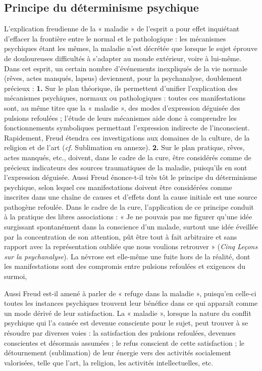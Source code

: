 \subsection{Principe du déterminisme psychique}

L'explication freudienne de la « maladie » de l'esprit a pour effet inquiétant
d'effacer la frontière entre le normal et
le pathologique : les mécanismes psychiques étant les mêmes, la maladie
n'est décrétée que lorsque le sujet
éprouve de douloureuses difficultés à
s'adapter au monde extérieur, voire à
lui-même. Dans cet esprit, un certain
nombre d'événements inexpliqués de la
vie normale (rêves, actes manqués,
lapsus) deviennent, pour la psychanalyse, doublement précieux : {\bf 1.} Sur le
plan théorique, ils permettent d’unifier
l'explication des mécanismes  psychiques, normaux ou pathologiques :
toutes ces manifestations sont, au même
titre que la « maladie », des modes d’expression déguisée des pulsions refoulées ; l'étude de leurs
mécanismes aide donc à comprendre les
fonctionnements symboliques permettant l'expression indirecte de l’inconscient. Rapidement, Freud étendra ces
investigations aux domaines de la
culture, de la religion et de l’art ({\it cf.}
Sublimation en annexe). {\bf 2.} Sur le plan pratique,
rêves, actes manqués, etc., doivent, dans
le cadre de la cure, être considérés
comme de précieux indicateurs des
sources traumatiques de la maladie,
puisqu'ils en sont l'expression déguisée.
Aussi Freud énonce-t-il très tôt le principe du déterminisme psychique, selon
lequel ces manifestations doivent être
considérées comme inscrites dans une
chaîne de causes et d'effets dont la
cause initiale est une source pathogène
refoulée. Dans le cadre de la cure, l'application de ce principe conduit à la pratique des libres associations : « Je ne
pouvais pas me figurer qu'une idée surgissant spontanément dans la
conscience d’un malade, surtout une
idée éveillée par la concentration de son
attention, pût être tout à fait arbitraire et
sans rapport avec la représentation
oubliée que nous voulions retrouver »
({\it Cinq Leçons sur la psychanalyse}). La
névrose est elle-même une fuite hors de
la réalité, dont les manifestations sont
des compromis entre pulsions refoulées
et exigences du surmoi,

Aussi Freud est-il amené à parler de
« refuge dans la maladie », puisqu'en
celle-ci toutes les instances psychiques
trouvent leur bénéfice dans ce qui apparaît comme un mode dérivé de leur
satisfaction. La « maladie », lorsque la
nature du conflit psychique qui l’a causée est devenue consciente pour le sujet,
peut trouver à se résoudre par diverses
voies : la satisfaction des pulsions refoulées, devenues conscientes et désormais
assumées ; le refus conscient de cette
satisfaction ; le détournement (sublimation) de leur énergie vers des activités
socialement valorisées, telle que l’art, la
religion, les activités intellectuelles, etc.

